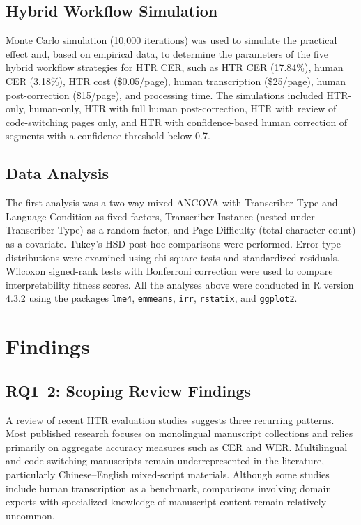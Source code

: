 \documentclass[final]{anthology-ch} %
\begin{document}
\subsection{Hybrid Workflow Simulation}

Monte Carlo simulation (10,000 iterations) was used to simulate the practical effect and, based on empirical data, to determine the parameters of the five hybrid workflow strategies for HTR CER, such as HTR CER (17.84\%), human CER (3.18\%), HTR cost (\$0.05/page), human transcription (\$25/page), human post-correction (\$15/page), and processing time. The simulations included HTR-only, human-only, HTR with full human post-correction, HTR with review of code-switching pages only, and HTR with confidence-based human correction of segments with a confidence threshold below 0.7.

\subsection{Data Analysis}

The first analysis was a two-way mixed ANCOVA with Transcriber Type and Language Condition as fixed factors, Transcriber Instance (nested under Transcriber Type) as a random factor, and Page Difficulty (total character count) as a covariate. Tukey's HSD post-hoc comparisons were performed. Error type distributions were examined using chi-square tests and standardized residuals. Wilcoxon signed-rank tests with Bonferroni correction were used to compare interpretability fitness scores. All the analyses above were conducted in R version 4.3.2 using the packages \texttt{lme4}, \texttt{emmeans}, \texttt{irr}, \texttt{rstatix}, and \texttt{ggplot2}.

\section{Findings} \label{sec:findings}

\subsection{RQ1--2: Scoping Review Findings}

A review of recent HTR evaluation studies suggests three recurring patterns. Most published research focuses on monolingual manuscript collections and relies primarily on aggregate accuracy measures such as CER and WER. Multilingual and code-switching manuscripts remain underrepresented in the literature, particularly Chinese--English mixed-script materials. Although some studies include human transcription as a benchmark, comparisons involving domain experts with specialized knowledge of manuscript content remain relatively uncommon.
\end{document}
